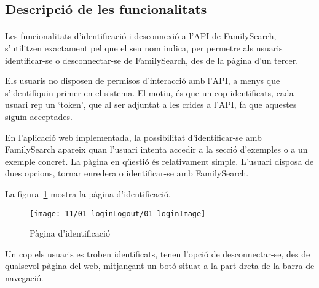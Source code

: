 \subsection{Descripció de les funcionalitats}

    \paragraph{}
    Les funcionalitats d'identificació i desconnexió a l'API de FamilySearch, s'utilitzen exactament pel que el seu nom indica, per permetre als usuaris identificar-se o desconnectar-se de FamilySearch, des de la pàgina d'un tercer.

    Els usuaris no disposen de permisos d'interacció amb l'API, a menys que s'identifiquin primer en el sistema. El motiu, és que un cop identificats, cada usuari rep un `token', que al ser adjuntat a les crides a l'API, fa que aquestes siguin acceptades.

    En l'aplicació web implementada, la possibilitat d'identificar-se amb FamilySearch apareix quan l'usuari intenta accedir a la secció d'exemples o a un exemple concret. La pàgina en qüestió és relativament simple. L'usuari disposa de dues opcions, tornar enredera o identificar-se amb FamilySearch.

    La figura~\ref{fig:fsLogin} mostra la pàgina d'identificació.

    \begin{figure}
        \texttt{[image: 11/01\_loginLogout/01\_loginImage]}
        \centering
        \caption{Pàgina d'identificació}\label{fig:fsLogin}
    \end{figure}

    Un cop els usuaris es troben identificats, tenen l'opció de desconnectar-se, des de qualsevol pàgina del web, mitjançant un botó situat a la part dreta de la barra de navegació.
